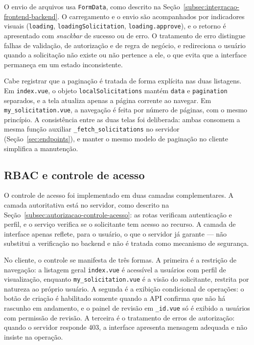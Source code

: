 O envio de arquivos usa \texttt{FormData}, como descrito na Seção~\ref{subsec:integracao-frontend-backend}. O carregamento e o envio são
acompanhados por indicadores visuais (\texttt{loading}, \texttt{loadingSolicitation},
\texttt{loading.approve}), e o retorno é apresentado com \textit{snackbar} de sucesso ou de
erro. O tratamento de erro distingue falhas de validação, de autorização e de regra de negócio,
e redireciona o usuário quando a solicitação não existe ou não pertence a ele, o que evita que a
interface permaneça em um estado inconsistente.

Cabe registrar que a paginação é tratada de forma explícita nas duas listagens. Em
\texttt{index.vue}, o objeto \texttt{localSolicitations} mantém \texttt{data} e
\texttt{pagination} separados, e a tela atualiza apenas a página corrente ao navegar. Em
\texttt{my\_solicitation.vue}, a navegação é feita por número de páginas, com o mesmo princípio.
A consistência entre as duas telas foi deliberada: ambas consomem a mesma função auxiliar
\texttt{\_fetch\_solicitations} no servidor (Seção~\ref{sec:endpoints}), e manter o mesmo modelo de paginação
no cliente simplifica a manutenção.

\subsection{RBAC e controle de acesso}

O controle de acesso foi implementado em duas camadas complementares. A camada
autoritativa está no servidor, como descrito na Seção~\ref{subsec:autorizacao-controle-acesso}: as rotas verificam
autenticação e perfil, e o serviço verifica se o solicitante tem acesso ao recurso. A
camada de interface apenas reflete, para o usuário, o que o servidor já garante --- não
substitui a verificação no backend e não é tratada como mecanismo de segurança.

No cliente, o controle se manifesta de três formas. A primeira é a restrição de navegação: a
listagem geral \texttt{index.vue} é acessível a usuários com perfil de visualização, enquanto
\texttt{my\_solicitation.vue} é a visão do solicitante, restrita por natureza ao próprio
usuário. A segunda é a exibição condicional de operações: o botão de criação é habilitado
somente quando a API confirma que não há rascunho em andamento, e o painel de revisão em
\texttt{\_id.vue} só é exibido a usuários com permissão de revisão. A terceira é o tratamento de
erros de autorização: quando o servidor responde 403, a interface apresenta mensagem adequada e
não insiste na operação.

